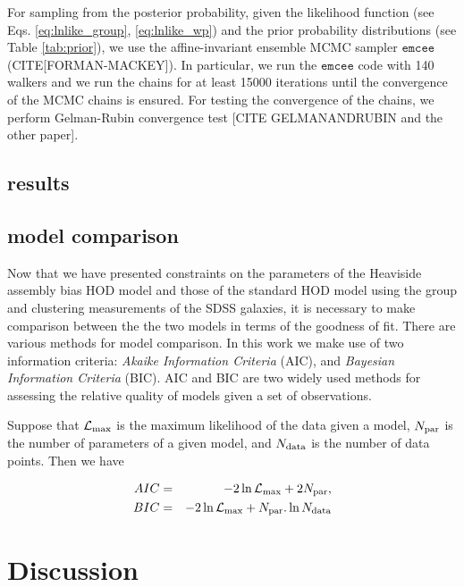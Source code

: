 \documentclass[12pt, preprint]{aastex}
\begin{document}
For sampling from the posterior probability, given the likelihood function (see Eqs. \ref{eq:lnlike_group}, \ref{eq:lnlike_wp}) and the prior probability distributions (see Table \ref{tab:prior}), we use the affine-invariant ensemble MCMC sampler $\mathtt{emcee}$ (CITE[FORMAN-MACKEY]). In particular, we run the $\mathtt{emcee}$ code with 140 walkers and we run the chains for at least 15000 iterations until the convergence of the MCMC chains is ensured. For testing the convergence of the chains, we perform Gelman-Rubin convergence test [CITE GELMANANDRUBIN and the other paper].

\subsection{results}


\subsection{model comparison}

Now that we have presented constraints on the parameters of the Heaviside assembly bias HOD model and those of the standard HOD model using the group and clustering measurements of the SDSS galaxies, it is necessary to make comparison between the the two models in terms of the goodness of fit. There are various methods for model comparison. In this work we make use of two information criteria: \emph{Akaike Information Criteria} (AIC), and \emph{Bayesian Information Criteria} (BIC). AIC and BIC are two widely used methods for assessing the relative quality of models given a set of observations.

Suppose that $\mathcal{L}_{\rm max}$ is the maximum likelihood of the data given a model, $N_{\rm par}$ is the number of parameters of a given model, and $N_{\rm data}$ is the number of data points. Then we have

\begin{eqnarray}
AIC&=& -2\ln \mathcal{L}_{\rm max} + 2N_{\rm par}, \\
BIC&=& -2\ln \mathcal{L}_{\rm max} + N_{\rm par}.\ln N_{\rm data}
\end{eqnarray}

\section{Discussion}



\end{document}
